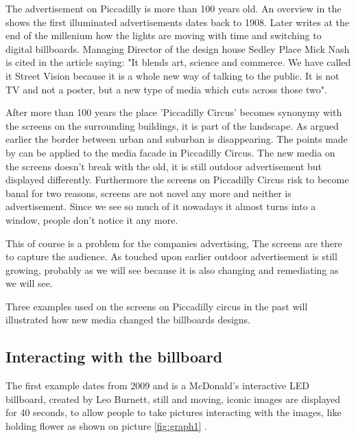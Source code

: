 \documentclass[a4paper, 11pt]{article}
\begin{document}
The advertisement on Piccadilly is more than 100 years old. An overview in the \cite{telegraph2011} shows the first illuminated advertisements dates back to 1908. Later \cite{nelson1998} writes at the end of the millenium how the lights are moving with time and switching to digital billboards. Managing Director of the design house Sedley Place Mick Nash is cited in the article saying: "It blends art, science and commerce. We have called it Street Vision because it is a whole new way of talking to the public. It is not TV and not a poster, but a new type of media which cuts across those two"\cite{nelson1998}.

After more than 100 years the place 'Piccadilly Circus' becomes synonymy with the screens on the surrounding buildings, it is part of the landscape. As \cite{Slaatta2006} argued earlier the border between urban and suburban is disappearing. The points made by \cite{Graham} can be applied to the media facade in Piccadilly Circus. The new media on the screens doesn't break with the old, it is still outdoor advertisement but displayed differently. Furthermore the screens on Piccadilly Circus risk to become banal for two reasons, screens are not novel any more and neither is advertisement. Since we see so much of it nowadays it almost turns into a window, people don't notice it any more.

This of course is a problem for the companies advertising, The screens are there to capture the audience. As touched upon earlier outdoor advertisement is still growing, probably as we will see because it is also changing and remediating as we will see. 

Three examples used on the screens on Piccadilly circus in the past will illustrated how new media changed the billboards designs.

\subsection {Interacting with the billboard}

The first example dates from 2009 and is a McDonald's interactive LED billboard, created by Leo Burnett, still and moving, iconic images are displayed for 40 seconds, to allow people to take pictures interacting with the images, like holding flower as shown on picture \ref{fig:graph1} \citep{campaign2009}. 
\end{document}
